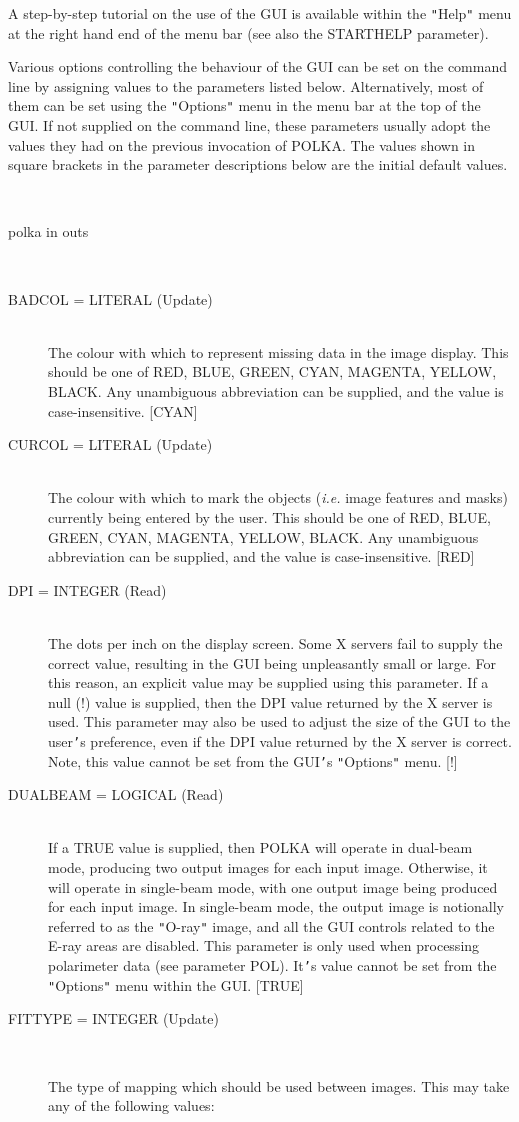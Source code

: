 \documentclass[twoside,11pt]{article}
\renewcommand{\_}{\texttt{\symbol{95}}}
\newcommand{\sstusage}[1]{\item[Usage:] \mbox{}
\\[1.3ex]{\raggedright \ssttt #1}}
\newcommand{\sstparameters}[1]{
   \item[Parameters:] \mbox{} \\
   \vspace{-3.5ex}
   \begin{description}
      #1
   \end{description}
}
\newcommand{\sstsubsection}[1]{ \item[{#1}] \mbox{} \\}
\newcommand{\sstusage}[1]{\item[Usage:]
      \begin{description}
         {\ssttt #1}
      \end{description}
      \\
   }
\newcommand{\sstparameters}[1]{
      \item[Parameters:] \\
      \begin{description}
         #1
      \end{description}
      \\
   }
\newcommand{\sstsubsection}[1]{\item[{#1}]}
\begin{document}
{{      A step-by-step tutorial on the use of the GUI is available within the
      {\tt "}Help{\tt "} menu at the right hand end of the menu bar (see also the STARTHELP
      parameter).

      Various options controlling the behaviour of the GUI can be set on the
      command line by assigning values to the parameters listed below.
      Alternatively, most of them can be set using the {\tt "}Options{\tt "} menu in the
      menu bar at the top of the GUI. If not supplied on the command line,
      these parameters usually adopt the values they had on the previous
      invocation of POLKA. The values shown in square brackets in the parameter
      descriptions below are the initial default values.
   }
   \sstusage{
      polka in out\_s
   }
   \sstparameters{
      \sstsubsection{
         BADCOL = LITERAL (Update)
      }{
         The colour with which to represent missing data in the image
         display. This should be one of RED, BLUE, GREEN, CYAN, MAGENTA,
         YELLOW, BLACK. Any unambiguous abbreviation can be supplied, and
         the value is case-insensitive. [CYAN]
      }
      \sstsubsection{
         CURCOL = LITERAL (Update)
      }{
         The colour with which to mark the objects (\emph{i.e.} image features and
         masks) currently being entered by the user. This should be
         one of RED, BLUE, GREEN, CYAN, MAGENTA, YELLOW, BLACK. Any
         unambiguous abbreviation can be supplied, and the value is
         case-insensitive. [RED]
      }
      \sstsubsection{
         DPI = \_INTEGER (Read)
      }{
         The dots per inch on the display screen. Some X servers fail to
         supply the correct value, resulting in the GUI being unpleasantly
         small or large. For this reason, an explicit value may be supplied
         using this parameter. If a null (!) value is supplied, then the
         DPI value returned by the X server is used. This parameter may
         also be used to adjust the size of the GUI to the user{\tt '}s
         preference, even if the DPI value returned by the X server is correct.
         Note, this value cannot be set from the GUI{\tt '}s {\tt "}Options{\tt "} menu. [!]
      }
      \sstsubsection{
         DUALBEAM = \_LOGICAL (Read)
      }{
         If a TRUE value is supplied, then POLKA will operate in
         dual-beam mode, producing two output images for each input image.
         Otherwise, it will operate in single-beam mode, with one output
         image being produced for each input image. In single-beam mode,
         the output image is notionally referred to as the {\tt "}O-ray{\tt "} image,
         and all the GUI controls related to the E-ray areas are disabled.
         This parameter is only used when processing polarimeter data
         (see parameter POL). It{\tt '}s value cannot be set from the
         {\tt "}Options{\tt "} menu within the GUI. [TRUE]
      }
      \sstsubsection{
         FITTYPE = \_INTEGER (Update)
      }{
         The type of mapping which should be used between images. This
         may take any of the following values:

}}}
\end{document}
